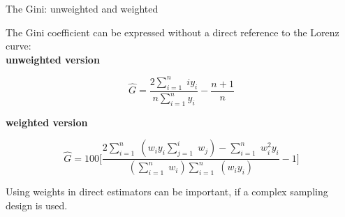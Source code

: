 \documentclass[fleqn,final]{beamer}
\newcommand{\Pheight}{\rule[-5mm]{0cm}{1cm}}
\begin{document}
\begin{frame}
\begin{columns}[t]
\begin{column}{.3\linewidth}
 \begin{block}{The Gini: unweighted and weighted \Pheight}
The Gini coefficient can be expressed without a direct reference to the Lorenz curve:\\
\vskip 0.5cm
\textbf{unweighted version}
\begin{tcolorbox}
\begin{equation*}
\hat{G}={\frac {2\sum_{i=1}^{n}\;iy_{i}}{n\sum _{i=1}^{n}y_{i}}}-{\frac {n+1}{n}}
\end{equation*}
\end{tcolorbox}
\vskip 0.5cm
\textbf{weighted version}
\begin{tcolorbox}
\begin{equation*}
\hat{G}=100\Bigg[{\frac {2\sum_{i=1}^{n}\;(w_{i}y_{i}\sum_{j=1}^{i}\;w_{j})-\sum_{i=1}^{n}\;w_{i}^{2}y_{i}}{(\sum_{i=1}^{n}\;w_{i})\sum_{i=1}^{n}\;(w_{i}y_{i})}-1}\Bigg]
\end{equation*}
\end{tcolorbox}
\vskip 0.5cm
{\selectfont{}\relax} Using weights in direct estimators can be important, if a complex sampling design is used. 
\end{block}
\end{column}

%
%

\end{columns}


\begin{columns}[t]


%
%



\end{columns}
\end{frame}
\end{document}
